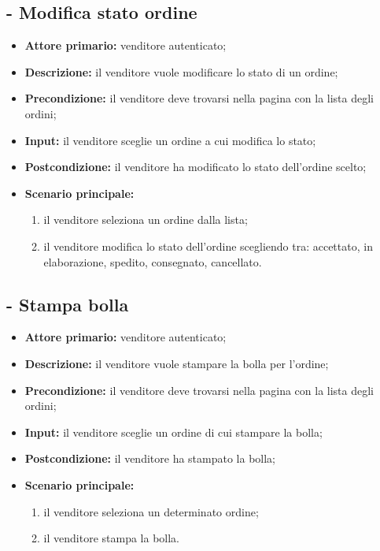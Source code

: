 \subsection{- Modifica stato ordine}
\begin{itemize}
    \item \textbf{Attore primario:} venditore autenticato;
    \item \textbf{Descrizione:} il venditore vuole modificare lo stato di un ordine;
    \item \textbf{Precondizione:} il venditore deve trovarsi nella pagina con la lista degli ordini;
    \item \textbf{Input:} il venditore sceglie un ordine a cui modifica lo stato;
    \item \textbf{Postcondizione:} il venditore ha modificato lo stato dell'ordine scelto;
    \item \textbf{Scenario principale:}
          \begin{enumerate}
              \item il venditore seleziona un ordine dalla lista;
              \item il venditore modifica lo stato dell'ordine scegliendo tra: accettato, in elaborazione, spedito, consegnato, cancellato.
          \end{enumerate}
\end{itemize}

\stepUserCase
\subsection{- Stampa bolla}
\begin{itemize}
    \item \textbf{Attore primario:} venditore autenticato;
    \item \textbf{Descrizione:} il venditore vuole stampare la bolla per l'ordine;
    \item \textbf{Precondizione:} il venditore deve trovarsi nella pagina con la lista degli ordini;
    \item \textbf{Input:} il venditore sceglie un ordine di cui stampare la bolla;
    \item \textbf{Postcondizione:} il venditore ha stampato la bolla;
    \item \textbf{Scenario principale:}
          \begin{enumerate}
              \item il venditore seleziona un determinato ordine;
              \item il venditore stampa la bolla.
          \end{enumerate}
\end{itemize}

